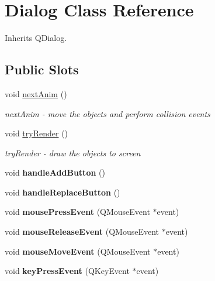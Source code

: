\hypertarget{class_dialog}{}\section{Dialog Class Reference}
\label{class_dialog}


Inherits Q\+Dialog.

\subsection*{Public Slots}
\begin{DoxyCompactItemize}
\item 
\mbox{\label{class_dialog_a45158754d3f4531b29a0f50abde94597}} 
void \mbox{\hyperlink{class_dialog_a45158754d3f4531b29a0f50abde94597}{next\+Anim}} ()
\begin{DoxyCompactList}\small\item\em next\+Anim -\/ move the objects and perform collision events \end{DoxyCompactList}\item 
\mbox{\label{class_dialog_aa887f720e12758049bb9f1f1814759da}} 
void \mbox{\hyperlink{class_dialog_aa887f720e12758049bb9f1f1814759da}{try\+Render}} ()
\begin{DoxyCompactList}\small\item\em try\+Render -\/ draw the objects to screen \end{DoxyCompactList}\item 
\mbox{\label{class_dialog_a193bf90e041064df1a5c7f40d251734a}} 
void {\bfseries handle\+Add\+Button} ()
\item 
\mbox{\label{class_dialog_aed18452251b1a5f073e552d346f6398f}} 
void {\bfseries handle\+Replace\+Button} ()
\item 
\mbox{\label{class_dialog_a95aaa4d78bda5c07650d383d3c5292ac}} 
void {\bfseries mouse\+Press\+Event} (Q\+Mouse\+Event $\ast$event)
\item 
\mbox{\label{class_dialog_a95158bddb719a98816c8432ddb096b27}} 
void {\bfseries mouse\+Release\+Event} (Q\+Mouse\+Event $\ast$event)
\item 
\mbox{\label{class_dialog_aea6bb029efbb1eaa374bd938ff0afabf}} 
void {\bfseries mouse\+Move\+Event} (Q\+Mouse\+Event $\ast$event)
\item 
\mbox{\label{class_dialog_aa687205f957253ec53f4ce47b49d302b}} 
void {\bfseries key\+Press\+Event} (Q\+Key\+Event $\ast$event)
\end{DoxyCompactItemize}
